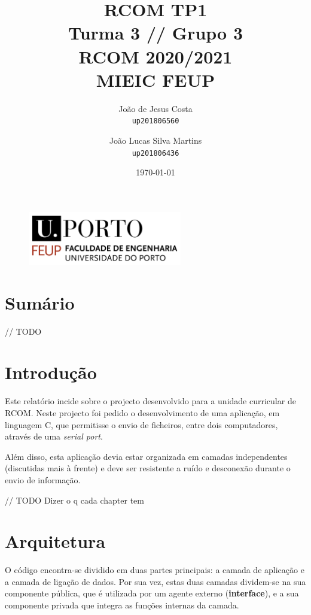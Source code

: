 \documentclass[11pt]{report}
\begin{document}
\title{\huge{\textbf{RCOM TP1}} \\ Turma 3 // Grupo 3 \\ RCOM 2020/2021 \\ MIEIC FEUP}
\author{João de Jesus Costa \\ \texttt{up201806560} \and
	João Lucas Silva Martins \\ \texttt{up201806436}}
\date{\today{}}

\begin{figure}[b]
	\centering
	\includegraphics[width=0.6\textwidth]{feup_logo.png}
\end{figure}
\maketitle{}

\tableofcontents{}
\newpage

\chapter{Sumário}
// TODO

{\let\clearpage\relax \chapter{Introdução}}
Este relatório incide sobre o projecto desenvolvido para a unidade curricular
de RCOM. Neste projecto foi pedido o desenvolvimento de uma aplicação, em
linguagem C, que permitisse o envio de ficheiros, entre dois computadores,
através de uma \textit{serial port}.

Além disso, esta aplicação devia estar organizada em camadas independentes
(discutidas mais à frente) e deve ser resistente a ruído e desconexão durante
o envio de informação.

// TODO Dizer o q cada chapter tem

{\let\clearpage\relax \chapter{Arquitetura}}

O código encontra-se dividido em duas partes principais: a camada de aplicação e
a camada de ligação de dados. Por sua vez, estas duas camadas dividem-se na sua
componente pública, que é utilizada por um agente externo (\textbf{interface}), e a sua
componente privada que integra as funções internas da camada.
\end{document}
